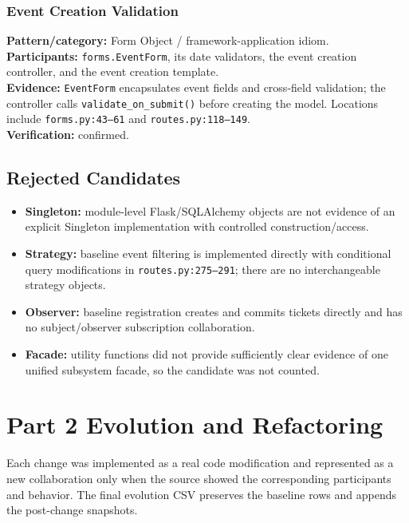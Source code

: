 \documentclass[11pt,a4paper]{article}
\begin{document}
\subsubsection{Event Creation Validation}
\textbf{Pattern/category:} Form Object / framework-application idiom.\\
\textbf{Participants:} \texttt{forms.EventForm}, its date validators, the event creation controller, and the event creation template.\\
\textbf{Evidence:} \texttt{EventForm} encapsulates event fields and cross-field validation; the controller calls \texttt{validate\_on\_submit()} before creating the model. Locations include \texttt{forms.py:43--61} and \texttt{routes.py:118--149}.\\
\textbf{Verification:} confirmed.

\subsection{Rejected Candidates}
\begin{itemize}
\item \textbf{Singleton:} module-level Flask/SQLAlchemy objects are not evidence of an explicit Singleton implementation with controlled construction/access.
\item \textbf{Strategy:} baseline event filtering is implemented directly with conditional query modifications in \texttt{routes.py:275--291}; there are no interchangeable strategy objects.
\item \textbf{Observer:} baseline registration creates and commits tickets directly and has no subject/observer subscription collaboration.
\item \textbf{Facade:} utility functions did not provide sufficiently clear evidence of one unified subsystem facade, so the candidate was not counted.
\end{itemize}

\section{Part 2 Evolution and Refactoring}
Each change was implemented as a real code modification and represented as a new collaboration only when the source showed the corresponding participants and behavior. The final evolution CSV preserves the baseline rows and appends the post-change snapshots.
\end{document}
